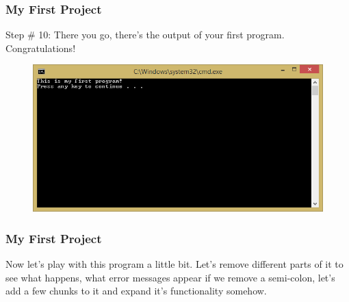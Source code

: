 \documentclass{beamer}
\begin{document}
\begin{frame}
    \frametitle{My First Project}
    Step \# 10: There you go, there's the output of your first program. Congratulations!
    \begin{figure}
        \centering
        \includegraphics[scale=0.6]{step_15}
    \end{figure}
\end{frame}

\begin{frame}
    \frametitle{My First Project}
    Now let's play with this program a little bit. Let's remove different parts of it to see what happens, what error messages appear if we remove a semi-colon, let's add a few chunks to it and expand it's functionality somehow.
\end{frame}
\end{document}
